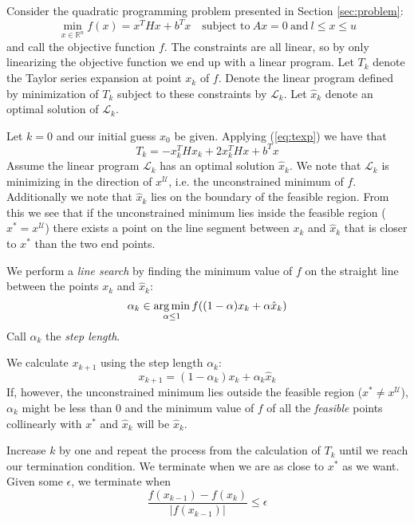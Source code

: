 Consider the quadratic programming problem presented in Section
\ref{sec:problem}:
\[
\min_{x \in \mathbb{R}^n} f(x) = x^T H x + b^T x
\quad \textrm{subject to}
~
Ax = 0
~
\textrm{and}
~
l \le x \le u
\]
and call the objective function $f$.
The constraints are all linear, so by only linearizing the objective function
we end up with a linear program.
Let $T_k$ denote the Taylor series expansion at point $x_k$ of $f$.
Denote the linear program defined by minimization of $T_k$ subject to these
constraints by $\mathcal{L}_k$.
Let $\hat{x}_k$ denote an optimal solution of $\mathcal{L}_k$.

Let $k = 0$ and our initial guess $x_0$ be given.
Applying (\ref{eq:texp}) we have that
\[
T_k = - x_k^THx_k + 2x_k^THx + b^Tx
\]
Assume the linear program $\mathcal{L}_k$ has an optimal solution $\hat{x}_k$.
We note that $\mathcal{L}_k$ is minimizing in the direction of
$x^{\mathcal{U}}$, i.e. the unconstrained minimum of $f$.
Additionally we note that $\hat{x}_k$ lies on the boundary of the feasible
region.
From this we see that if the unconstrained minimum lies inside the feasible
region ($x^* = x^\mathcal{U}$) there exists a point on the line segment between
$x_k$ and $\hat{x}_k$ that is closer to $x^*$ than the two end points.

We perform a \emph{line search} by finding the minimum value of $f$ on the
straight line between the points $x_k$ and $\hat{x}_k$:
\[
\alpha_k \in \operatorname*{arg\,min}_{\alpha \leq 1} f((1-\alpha) x_k + \alpha \hat{x}_k)
\]
Call $\alpha_k$ the \emph{step length}.

We calculate $x_{k+1}$ using the step length $\alpha_k$:
\[
x_{k+1} = (1-\alpha_k) x_k + \alpha_k\hat{x}_k
\]
If, however, the unconstrained minimum lies outside the feasible region
($x^* \neq x^\mathcal{U}$), $\alpha_k$ might be less than $0$ and the minimum
value of $f$ of all the \emph{feasible} points collinearly with $x^*$ and
$\hat{x}_k$ will be $\hat{x}_k$.

Increase $k$ by one and repeat the process from the calculation of $T_k$ until
we reach our termination condition.
We terminate when we are as close to $x^*$ as we want.
Given some $\epsilon$, we terminate when
\[
\frac{f(x_{k-1}) - f(x_k)}{|f(x_{k-1})|} \leq \epsilon
\]


